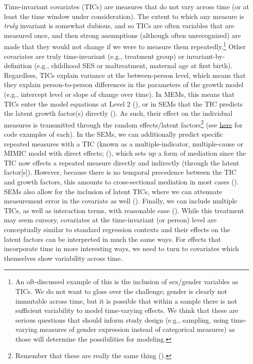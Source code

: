 \documentclass[11pt]{article}
\begin{document}
Time-invariant covariates (TICs) are measures that do not vary across time (or at least the time window under consideration). The extent to which any measure is \textit{truly} invariant is somewhat dubious, and so TICs are often variables that are measured once, and then strong assumptions (although often unrecognized) are made that they would not change if we were to measure them repeatedly.\footnote{An oft-discussed example of this is the inclusion of sex/gender variables as TICs. We do not want to gloss over the challenge; gender is clearly not immutable across time, but it is possible that within a sample there is not sufficient variability to model time-varying effects. We think that these are serious questions that should inform study design (e.g., sampling, using time-varying measures of gender expression instead of categorical measures) as those will determine the possibilities for modeling.} Other covariates are truly time-invariant (e.g., treatment group) or invariant-by-definition (e.g., childhood SES or maltreatment, maternal age at first birth). Regardless, TICs explain variance at the between-person level, which means that they explain person-to-person differences in the parameters of the growth model (e.g., intercept level or slope of change over time). In MEMs, this means that TICs enter the model equations at Level 2 (\cite{curran_disaggregation_2011}), or in SEMs that the TIC predicts the latent growth factor(s) directly (\cite{biesanz_role_2004}). As such, their effect on the individual measures is transmitted through the random effects/latent factors\footnote{Remember that these are really the same thing (\cite{curran_have_2003,bauer_estimating_2003}).} (see \href{https://e-m-mccormick.github.io/static/longitudinal-primer/05-covariates.html#covariates-1}{here} for code examples of each). In the SEMs, we can additionally predict specific repeated measures with a TIC (known as a multiple-indicator, multiple-cause or MIMIC model with direct effects; (\cite{bauer_more_2017,jacobucci_practical_2019,joreskog_estimation_1975,kievit_distinct_2014,stoel_including_2004}), which sets up a form of mediation since the TIC now effects a repeated measure directly and indirectly (through the latent factor[s]). However, because there is no temporal precedence between the TIC and growth factors, this amounts to cross-sectional mediation in most cases (\cite{curran_separation_2014,curran_disaggregation_2011,hamaker_model_2014}). SEMs also allow for the inclusion of latent TICs, where we can attenuate measurement error in the covariate as well (\cite{bollen_latent_2002}). Finally, we can include multiple TICs, as well as interaction terms, with reasonable ease (\cite{curran_testing_2004,curran_disaggregation_2011,preacher_computational_2006}). While this treatment may seem cursory, covariates at the time-invariant (or person) level are conceptually similar to standard regression contexts and their effects on the latent factors can be interpreted in much the same ways. For effects that incorporate time in more interesting ways, we need to turn to covariates which themselves show variability across time.
\end{document}
